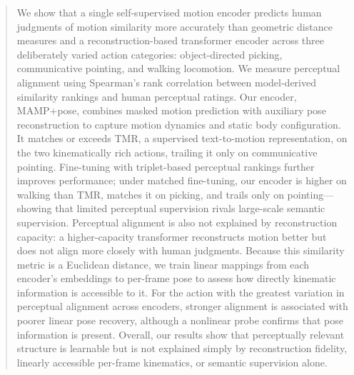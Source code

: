 \documentclass[letterpaper]{article} %
\begin{document}
\begin{abstract}

We show that a single self-supervised motion encoder predicts human judgments of motion similarity more accurately than geometric distance measures and a reconstruction-based transformer encoder across three deliberately varied action categories: object-directed picking, communicative pointing, and walking locomotion. We measure perceptual alignment using Spearman's rank correlation between model-derived similarity rankings and human perceptual ratings. Our encoder, MAMP+pose, combines masked motion prediction with auxiliary pose reconstruction to capture motion dynamics and static body configuration. It matches or exceeds TMR, a supervised text-to-motion representation, on the two kinematically rich actions, trailing it only on communicative pointing. Fine-tuning with triplet-based perceptual rankings further improves performance; under matched fine-tuning, our encoder is higher on walking than TMR, matches it on picking, and trails only on pointing---showing that limited perceptual supervision rivals large-scale semantic supervision. Perceptual alignment is also not explained by reconstruction capacity: a higher-capacity transformer reconstructs motion better but does not align more closely with human judgments. Because this similarity metric is a Euclidean distance, we train linear mappings from each encoder's embeddings to per-frame pose to assess how directly kinematic information is accessible to it. For the action with the greatest variation in perceptual alignment across encoders, stronger alignment is associated with poorer linear pose recovery, although a nonlinear probe confirms that pose information is present. Overall, our results
show that perceptually relevant structure is learnable but is not explained simply by reconstruction fidelity, linearly accessible per-frame kinematics, or semantic supervision alone.



\end{abstract}
\end{document}
